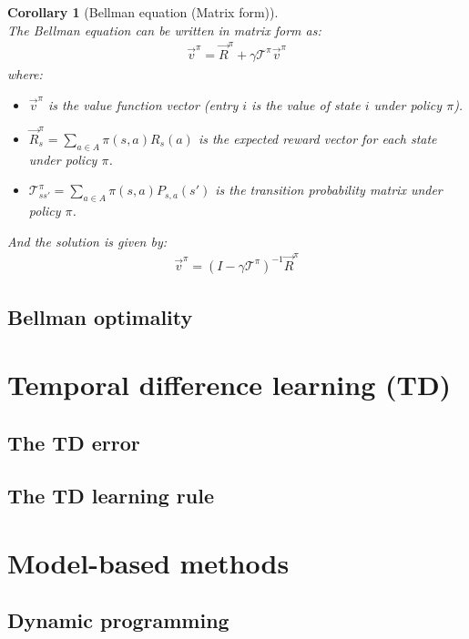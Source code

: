 \documentclass[11pt]{book} %
\newtheorem{corollary}{Corollary}[section]
\begin{document}
\begin{corollary}[Bellman equation (Matrix form)]\ \\
    The Bellman equation can be written in matrix form as:
    \begin{align*}
        \vec{v}^{\pi} = \vec{R}^{\pi} + \gamma \mathcal{T}^{\pi} \vec{v}^{\pi}
    \end{align*}
    where:
    \begin{itemize}
        \item $\vec{v}^{\pi}$ is the value function vector (entry $i$ is the value of state $i$ under policy $\pi$).
        \item $\vec{R}_s^{\pi} = \sum_{a \in A} \pi(s, a) R_s(a)$ is the expected reward vector for each state under policy $\pi$.
        \item $\mathcal{T}_{ss'}^{\pi} = \sum_{a \in A} \pi(s, a) P_{s,a}(s')$ is the transition probability matrix under policy $\pi$.
    \end{itemize}
    And the solution is given by:
    \begin{align*}
        \vec{v}^{\pi} = (I - \gamma \mathcal{T} ^{\pi})^{-1} \vec{R}^{\pi}
    \end{align*}

\end{corollary}


\subsection{Bellman optimality}


\section{Temporal difference learning (TD)}
\subsection{The TD error}
\subsection{The TD learning rule}

\section{Model-based methods}
\subsection{Dynamic programming}
\end{document}
